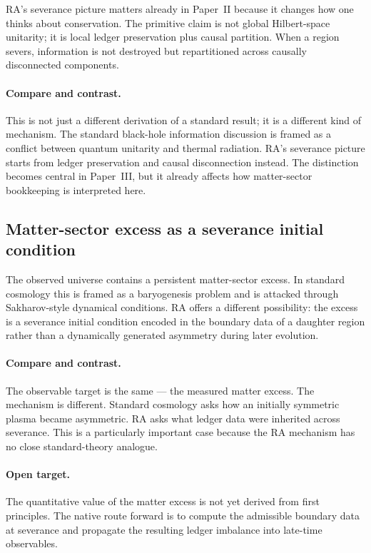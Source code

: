 \documentclass[11pt]{article}
\begin{document}
RA's severance picture matters already in Paper~II because it changes how one thinks about conservation. The primitive claim is not global Hilbert-space unitarity; it is local ledger preservation plus causal partition. When a region severs, information is not destroyed but repartitioned across causally disconnected components.

\paragraph{Compare and contrast.} This is not just a different derivation of a standard result; it is a different kind of mechanism. The standard black-hole information discussion is framed as a conflict between quantum unitarity and thermal radiation. RA's severance picture starts from ledger preservation and causal disconnection instead. The distinction becomes central in Paper~III, but it already affects how matter-sector bookkeeping is interpreted here.

\subsection{Matter-sector excess as a severance initial condition}

The observed universe contains a persistent matter-sector excess. In standard cosmology this is framed as a baryogenesis problem and is attacked through Sakharov-style dynamical conditions. RA offers a different possibility: the excess is a severance initial condition encoded in the boundary data of a daughter region rather than a dynamically generated asymmetry during later evolution.

\paragraph{Compare and contrast.} The observable target is the same --- the measured matter excess. The mechanism is different. Standard cosmology asks how an initially symmetric plasma became asymmetric. RA asks what ledger data were inherited across severance. This is a particularly important case because the RA mechanism has no close standard-theory analogue.

\paragraph{Open target.} The quantitative value of the matter excess is not yet derived from first principles. The native route forward is to compute the admissible boundary data at severance and propagate the resulting ledger imbalance into late-time observables.
\end{document}
